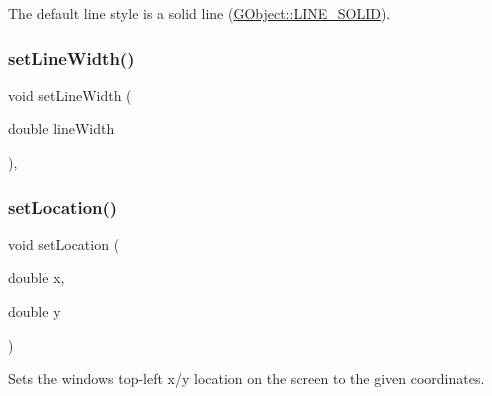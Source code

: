 The default line style is a solid line (\mbox{\hyperlink{classsgl_1_1GObject_a86e0f5648542856159bb40775c854aa7a700c78bc2cd76acaab26651bf7b4941f}{G\+Object\+::\+L\+I\+N\+E\+\_\+\+S\+O\+L\+ID}}). \mbox{\label{classsgl_1_1GForwardDrawingSurface_ad4c1188c73080ceb06795ff34ae34860}} 
\subsubsection{\texorpdfstring{set\+Line\+Width()}{setLineWidth()}}
{\footnotesize\ttfamily void set\+Line\+Width (\begin{DoxyParamCaption}\item[{double}]{line\+Width }\end{DoxyParamCaption})\hspace{0.3cm}{\ttfamily [override]}, {\ttfamily [inherited]}}

\mbox{\label{classsgl_1_1GWindow_a04594e8ba9b98513a64f1da00dcae18c}} 
\subsubsection{\texorpdfstring{set\+Location()}{setLocation()}\hspace{0.1cm}{\footnotesize\ttfamily [1/2]}}
{\footnotesize\ttfamily void set\+Location (\begin{DoxyParamCaption}\item[{double}]{x,  }\item[{double}]{y }\end{DoxyParamCaption})\hspace{0.3cm}{\ttfamily [virtual]}}



Sets the window\textquotesingle{}s top-\/left x/y location on the screen to the given coordinates. 

\mbox{\label{classsgl_1_1GWindow_a6ef8e1a904fffe55052f7a22f8552e4b}} 
